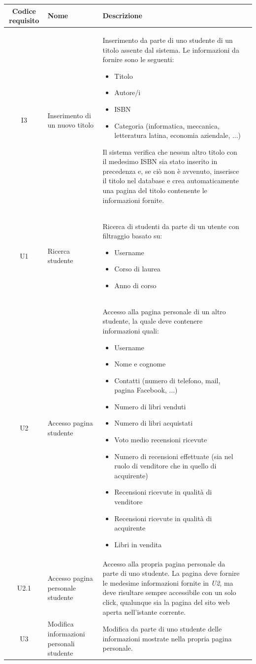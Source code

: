 \documentclass[10pt,a4paper]{report}
\begin{document}
	\begin{tabular}{cp{3cm}p{9cm}p{1cm}}
		Codice requisito&Nome&Descrizione\\ \hline
		I3&Inserimento di un nuovo titolo&Inserimento da parte di uno studente di un titolo assente dal sistema. Le informazioni da fornire sono le seguenti:
		\begin{itemize}
			\item Titolo
			\item Autore/i
			\item ISBN
			\item Categoria (informatica, meccanica, letteratura latina, economia aziendale, ...)
		\end{itemize}
		Il sistema verifica che nessun altro titolo con il medesimo ISBN sia stato inserito in precedenza e, se ciò non è avvenuto, inserisce il titolo nel database e crea automaticamente una pagina del titolo contenente le informazioni fornite.\\ \hline
		U1&Ricerca studente&Ricerca di studenti da parte di un utente con filtraggio basato su:
		\begin{itemize}
			\item Username
			\item Corso di laurea
			\item Anno di corso
		\end{itemize}\\ \hline
		U2&Accesso pagina studente&Accesso alla pagina personale di un altro studente, la quale deve contenere informazioni quali:
		\begin{itemize}
			\item Username
			\item Nome e cognome
			\item Contatti (numero di telefono, mail, pagina Facebook, ...)
			\item Numero di libri venduti
			\item Numero di libri acquistati
			\item Voto medio recensioni ricevute
			\item Numero di recensioni effettuate (sia nel ruolo di venditore che in quello di acquirente)
			\item Recensioni ricevute in qualità di venditore
			\item Recensioni ricevute in qualità di acquirente
			\item Libri in vendita
		\end{itemize}\\ \hline
		U2.1&Accesso pagina personale studente&Accesso alla propria pagina personale da parte di uno studente. La pagina deve fornire le medesime informazioni fornite in \textit{U2}, ma deve risultare sempre accessibile con un solo click, qualunque sia la pagina del sito web aperta nell'istante corrente.\\ \hline
		U3&Modifica informazioni personali studente&Modifica da parte di uno studente delle informazioni mostrate nella propria pagina personale.\\ \hline
	\end{tabular}
	\newpage
	
\end{document}
